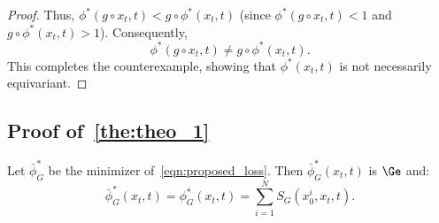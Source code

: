 \begin{proof}
Thus, \(\phi^*(g \circ x_t, t) < g \circ \phi^*(x_t, t)\) (since \(\phi^*(g \circ x_t, t) < 1\) and \(g \circ \phi^*(x_t, t) > 1\)). Consequently,  
\[
\phi^*(g \circ x_t, t) \neq g \circ \phi^*(x_t, t).
\]
This completes the counterexample, showing that \(\phi^*(x_t, t)\) is not necessarily equivariant.
\end{proof}

\subsection{Proof of~\cref{the:theo_1}}
\label{sub_app:theo_1}

\begingroup
\setcounter{theorem}{0} %
\renewcommand{\thetheorem}{\ref{the:theo_1}} %
\begin{tcolorbox}[title=Equivariant Minimizer of \(\mcL_t^G (\phi)\)]
\begin{theorem}
Let \( \bar{\phi}^*_G \) be the minimizer of~\eqref{eqn:proposed_loss}. Then \( \bar{\phi}^*_G(x_t, t) \) is \( \Ge \) and:
\[ \bar{\phi}^*_G(x_t, t) = \phi^*_G (x_t, t) = \sum_{i=1}^N S_G(x_0^i, x_t, t). \]
\end{theorem}
\end{tcolorbox}
\endgroup

